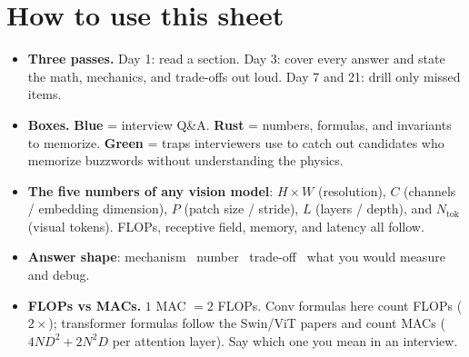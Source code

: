 \thispagestyle{plain}

\section*{How to use this sheet}
\begin{itemize}
\item \textbf{Three passes.} Day 1: read a section. Day 3: cover every answer and state the math, mechanics, and trade-offs out loud. Day 7 and 21: drill only missed items.
\item \textbf{Boxes.} {\color{acc}\textbf{Blue}} = interview Q\&A. {\color{acc2}\textbf{Rust}} = numbers, formulas, and invariants to memorize. {\color{acc3}\textbf{Green}} = traps interviewers use to catch out candidates who memorize buzzwords without understanding the physics.
\item \textbf{The five numbers of any vision model}: $H\times W$ (resolution), $C$ (channels / embedding dimension), $P$ (patch size / stride), $L$ (layers / depth), and $N_{\text{tok}}$ (visual tokens). FLOPs, receptive field, memory, and latency all follow.
\item \textbf{Answer shape}: mechanism \ra\ number \ra\ trade-off \ra\ what you would measure and debug.
\item \textbf{FLOPs vs MACs.} $1$ MAC $= 2$ FLOPs. Conv formulas here count FLOPs ($2\times$); transformer formulas follow the Swin/ViT papers and count MACs ($4ND^2 + 2N^2D$ per attention layer). Say which one you mean in an interview.
\end{itemize}

